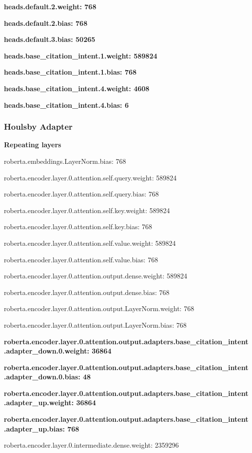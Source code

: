 \documentclass[draft,10pt,twocolumn,letterpaper]{article}
\begin{document}
\textbf{heads.default.2.weight: 768}

\textbf{heads.default.2.bias: 768}

\textbf{heads.default.3.bias: 50265}

\textbf{heads.base\_citation\_intent.1.weight: 589824}

\textbf{heads.base\_citation\_intent.1.bias: 768}

\textbf{heads.base\_citation\_intent.4.weight: 4608}

\textbf{heads.base\_citation\_intent.4.bias: 6}

\subsubsection{Houlsby Adapter}
\label{sec:houlsbymodel} 

\textbf{Repeating layers}

roberta.embeddings.LayerNorm.bias: 768

roberta.encoder.layer.0.attention.self.query.weight: 589824

roberta.encoder.layer.0.attention.self.query.bias: 768

roberta.encoder.layer.0.attention.self.key.weight: 589824

roberta.encoder.layer.0.attention.self.key.bias: 768

roberta.encoder.layer.0.attention.self.value.weight: 589824

roberta.encoder.layer.0.attention.self.value.bias: 768

roberta.encoder.layer.0.attention.output.dense.weight: 589824

roberta.encoder.layer.0.attention.output.dense.bias: 768

roberta.encoder.layer.0.attention.output.LayerNorm.weight: 768

roberta.encoder.layer.0.attention.output.LayerNorm.bias: 768

\textbf{roberta.encoder.layer.0.attention.output.adapters.base\_citation\_intent.adapter\_down.0.weight: 36864}

\textbf{roberta.encoder.layer.0.attention.output.adapters.base\_citation\_intent.adapter\_down.0.bias: 48}

\textbf{roberta.encoder.layer.0.attention.output.adapters.base\_citation\_intent.adapter\_up.weight: 36864}

\textbf{roberta.encoder.layer.0.attention.output.adapters.base\_citation\_intent.adapter\_up.bias: 768}

roberta.encoder.layer.0.intermediate.dense.weight: 2359296
\end{document}
